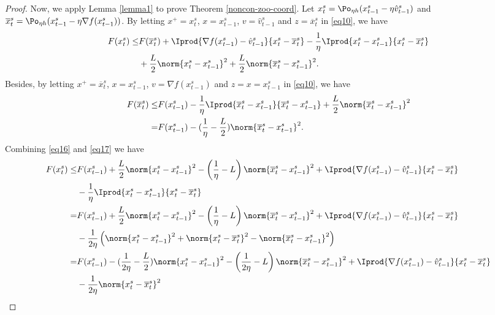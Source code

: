 \begin{proof}
Now, we apply Lemma \ref{lemma1} to prove Theorem \ref{noncon-zoo-coord}. Let $x_t^s = \Po_{\eta h} (x_{t-1}^s - \eta \hat{v}_{t-1}^s)$ and $\overline{x}_t^s = \Po_{\eta h} (x_{t-1}^s - \eta \nabla f(x_{t-1}^s))$. By letting $x^+ = x_t^s$, $x = x_{t-1}^s$, $v = \hat{v}_{t-1}^s$ and $z = \overline{x}_t^s$ in \eqref{eq10}, we have
\begin{align}
F(x^s_t) \leq& F(\overline{x}_t^s) + \Iprod{\nabla f(x_{t-1}^s)-\hat{v}_{t-1}^s}{x_t^s-\overline{x}_t^s}-\frac{1}{\eta} \Iprod{x_t^s-x_{t-1}^s}{x_t^s-\overline{x}_t^s}\notag\\
&+\frac{L}{2}\norm{x_t^s-x_{t-1}^s}^2+\frac{L}{2}\norm{\overline{x}_t^s-x_{t-1}^s}^2.\label{eq16}
\end{align}
Besides, by letting $x^+ = \overline{x}_t^s$, $x = x_{t-1}^s$, $v = \nabla f(x_{t-1}^s)$ and $z = x = {x}_{t-1}^s$ in \eqref{eq10}, we have
\begin{align}
F(\overline{x}_t^s) \leq& F({x}_{t-1}^s) - \frac{1}{\eta}\Iprod{\overline{x}_t^s-x_{t-1}^s}{\overline{x}_t^s - x_{t-1}^s}+\frac{L}{2}\norm{\overline{x}_t^s-x_{t-1}^s}^2\notag\\
 =& F({x}_{t-1}^s) -(\frac{1}{\eta}-\frac{L}{2})\norm{\overline{x}_t^s-x_{t-1}^s}^2.\label{eq17} 
\end{align}
Combining \eqref{eq16} and \eqref{eq17} we have 
 \begin{align}
 F({x}_t^s) \leq& F({x}_{t-1}^s) +\frac{L}{2}\norm{{x}_t^s-x_{t-1}^s}^2 - \left(\frac{1}{\eta}-L\right)\norm{\overline{x}_t^s-x_{t-1}^s}^2+\Iprod{\nabla f(x_{t-1}^s)-\hat{v}_{t-1}^s}{x_t^s - \overline{x}_t^s}\notag\\
 & -\frac{1}{\eta} \Iprod{x_t^s-x_{t-1}^s}{x_t^s-\overline{x}_{t}^s}\notag\\
  =& F({x}_{t-1}^s)  +\frac{L}{2}\norm{{x}_t^s-x_{t-1}^s}^2- \left(\frac{1}{\eta}-L\right)\norm{\overline{x}_t^s-x_{t-1}^s}^2+\Iprod{\nabla f(x_{t-1}^s)-\hat{v}_{t-1}^s}{x_t^s - \overline{x}_t^s}\notag\\
 &-\frac{1}{2\eta} \left(\norm{x_t^s-x_{t-1}^s}^2+ \norm{x_t^s-\overline{x}_{t}^s}^2-\norm{\overline{x}_{t}^s-x_{t-1}^s}^2\right)\notag\\
   =& F({x}_{t-1}^s)  -(\frac{1}{2\eta} - \frac{L}{2})\norm{{x}_t^s-x_{t-1}^s}^2- \left(\frac{1}{2\eta}-L\right)\norm{\overline{x}_t^s-x_{t-1}^s}^2+\Iprod{\nabla f(x_{t-1}^s)-\hat{v}_{t-1}^s}{x_t^s - \overline{x}_t^s}\notag\\
 & -\frac{1}{2\eta} \norm{x_t^s-\overline{x}_{t}^s}^2\notag\\

\end{align}
\end{proof}
